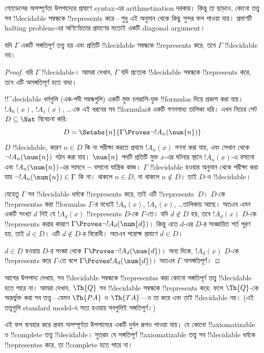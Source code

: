 \documentclass[../../../include/open-logic-section]{subfiles}
\begin{document}


গ্যোডেলের অসম্পূর্ণতা উপপাদ্যের প্রমাণে syntax-এর arithmetization দরকার। কিন্তু
তা ছাড়াও, কোনো তত্ত্ব সব !!{decidable} সম্বন্ধকে !!{represents} করে—শুধু এই
অনুমান থেকে কিছু সুন্দর ফল পাওয়া যায়। প্রমাণটি halting problem-এর
অণির্ণেয়তার প্রমাণের মতোই একটি diagonal argument।

\begin{thm}
যদি $\Gamma$ একটি সঙ্গতিপূর্ণ তত্ত্ব হয় এবং প্রতিটি !!{decidable} সম্বন্ধকে
!!{represents} করে, তবে $\Gamma$ !!{decidable} নয়।
\end{thm}

\begin{proof}
ধরি $\Gamma$ !!{decidable}। আমরা দেখাব, $\Gamma$ যদি প্রত্যেক
!!{decidable} সম্বন্ধকে !!{represents} করে, তবে এটি অসঙ্গতিপূর্ণ হতে বাধ্য।

!!^{decidable} ধর্মগুলি (এক-পদী সম্বন্ধগুলি) একটি মুক্ত চলরাশি-যুক্ত
!!{formula}s দিয়ে প্রকাশ করা যায়। $!A_0(x)$, $!A_1(x)$, \dots-কে এই ধরনের
সব !!{formula}sর একটি গণনসাধ্য তালিকা ধরি। এখন নিচের সেট $D \subseteq \Nat$
বিবেচনা করি:
\[
D = \Setabs{n}{\Gamma \Proves \lnot !A_n(\num{n})}
\]
$D$ !!{decidable}, কারণ $n \in D$ কি না পরীক্ষা করতে প্রথমে $!A_n(x)$
গণনা করা যায়, এবং সেখান থেকে $\lnot !A_n(\num{n})$ গঠন করা যায়।
$\num{n}$ পদটি প্রতিটি মুক্ত $x$-এর ঘটনার স্থানে $!A_n(x)$-এ বসানো এবং
$!A_n(\num{n})$-এর সামনে $\lnot$ বসানো যান্ত্রিক কাজ।
$\Gamma$ !!{decidable} হওয়ার অনুমান থেকে পরীক্ষা করা যায়
$\lnot !A_n(\num{n}) \in \Gamma$ কি না। থাকলে $n \in D$, না থাকলে
$n \notin D$। তাই $D$-ও !!{decidable}।

যেহেতু $\Gamma$ সব !!{decidable} ধর্মকে !!{represents} করে, তাই এটি
!!{represents}~$D$। $D$-কে !!{represents}s করা !!{formula}s $\Gamma$-র
মধ্যেই $!A_0(x)$, $!A_1(x)$, \dots তালিকায় আছে। অতএব এমন একটি সংখ্যা $d$ নিই
যে $!A_d(x)$ !!{represents} $D$-কে $\Gamma$-তে। যদি $d \notin D$ হয়,
তবে $!A_d(x)$ $D$-কে !!{represents} করার কারণে
$\Gamma \Proves \lnot !A_d(\num{d})$। কিন্তু এতে $d$-এর $D$-র সংজ্ঞায়িত
শর্ত পূরণ হয়, তাই $d \in D$। এটি $d \notin D$-র বিরোধী। অতএব পরোক্ষ
প্রমাণে $d \in D$।

$d \in D$ হওয়ায় $D$-র সংজ্ঞা থেকে
$\Gamma \Proves \lnot !A_d(\num{d})$। অন্য দিকে, $!A_d(x)$ $D$-কে
!!{represents} করে $\Gamma$-তে বলে
$\Gamma \Proves !A_d(\num{d})$। অতএব $\Gamma$ অসঙ্গতিপূর্ণ।
\end{proof}

\begin{explain}
আগের উপপাদ্য দেখায়, সব !!{decidable} সম্বন্ধকে !!{represents}s করা কোনো
সঙ্গতিপূর্ণ তত্ত্ব !!{decidable} হতে পারে না। আমরা দেখাব, $\Th{Q}$ সব
!!{decidable} সম্বন্ধকে !!{represents} করে; ফলে $\Th{Q}$-কে অন্তর্ভুক্ত করা
সব তত্ত্ব—যেমন $\Th{PA}$ ও $\Th{TA}$—ও তা করে এবং তাই !!{decidable} নয়।
(এই তত্ত্বগুলি standard model-এ সত্য হওয়ায় সবগুলিই সঙ্গতিপূর্ণ।)

এই ফল ব্যবহার করে প্রথম অসম্পূর্ণতা উপপাদ্যের একটি দুর্বল রূপও পাওয়া যায়।
যে কোনো !!{axiomatizable} ও !!{complete} তত্ত্ব !!{decidable}। সুতরাং যে
সঙ্গতিপূর্ণ !!{axiomatizable} তত্ত্ব সব !!{decidable} ধর্মকে !!{represents}s
করে, তা
!!{complete} হতে পারে না।
\end{explain}
\end{document}
